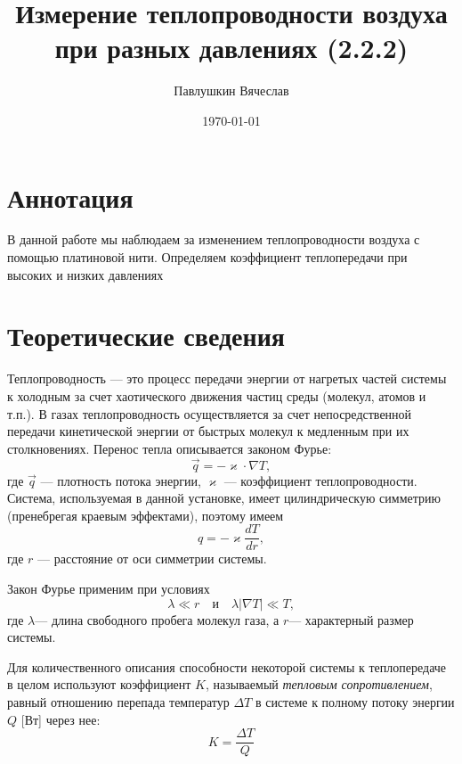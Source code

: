 \documentclass[a4paper,12pt]{article}
\title{Измерение теплопроводности воздуха при разных давлениях (2.2.2)}
\author{Павлушкин Вячеслав}
\date{\today}
\theoremstyle{definition}
\begin{document}
	\maketitle
	
	\section{Аннотация}
	В данной работе мы наблюдаем за изменением теплопроводности воздуха с помощью платиновой нити. Определяем коэффициент теплопередачи при высоких и низких давлениях
	
	\section{Теоретические сведения}
	
	Теплопроводность — это процесс передачи энергии от нагретых частей системы к холодным за счет хаотического движения частиц среды (молекул, атомов и т.п.). В газах теплопроводность осуществляется за счет непосредственной передачи кинетической энергии от быстрых молекул к медленным при их столкновениях. Перенос тепла описывается законом Фурье:
	\begin{equation}
		\vec{q} = -\varkappa\cdot\nabla T,
	\end{equation}
	где $\vec{q}$ --- плотность потока энергии, $\varkappa$ --- коэффициент теплопроводности. Система, используемая в данной установке, имеет цилиндрическую симметрию (пренебрегая краевым эффектами), поэтому имеем 
	\begin{equation}
		q = -\varkappa\frac{dT}{dr},
	\end{equation}
	где $r$ --- расстояние от оси симметрии системы.
	
	Закон Фурье применим при условиях $$\lambda\ll r\quad \text{и}\quad \lambda |\nabla T|\ll T, $$
	где $\lambda$--- длина свободного пробега молекул газа, а $r$--- характерный размер системы.
	
	Для количественного описания способности некоторой системы к теплопередаче в целом используют коэффициент $K$, называемый \emph{тепловым сопротивлением}, равный отношению перепада температур $\Delta T$ в системе к полному потоку энергии $Q$ [Вт] через нее:
	\begin{equation}
		K = \frac{\Delta T}{Q}
	\end{equation}
	
	
\end{document}
